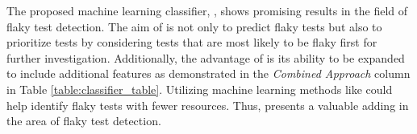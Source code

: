 The proposed machine learning classifier, \sysName, shows promising results in the field of flaky test detection. The aim of \sysName is not only to predict flaky tests but also to prioritize tests by considering tests that are most likely to be flaky first for further investigation. Additionally, the advantage of \sysName is its ability to be expanded to include additional features as demonstrated in the \emph{Combined Approach} column in Table \ref{table:classifier_table}. Utilizing machine learning methods like \sysName could help identify flaky tests with fewer resources. Thus, \sysName presents a valuable adding in the area of flaky test detection.